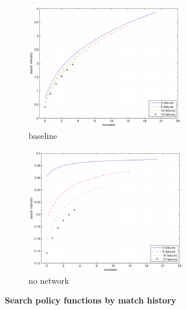 \begin{figure}[tbp]
\centering%
\begin{subfigure}[b]{0.7\textwidth}
        \includegraphics[width=\textwidth]{figures/figure2a.pdf}
        \caption{baseline}
        \label{fig:baseline_search_policy}
    \end{subfigure}
\par
\begin{subfigure}[b]{0.7\textwidth}
        \includegraphics[width=\textwidth]{figures/figure2b.pdf}
        \caption{no network}
        \label{fig:no_network_search_policy}
    \end{subfigure}
\caption{\textbf{Search policy functions by match history}}
\label{fig:search_policy_outer}
\end{figure}

